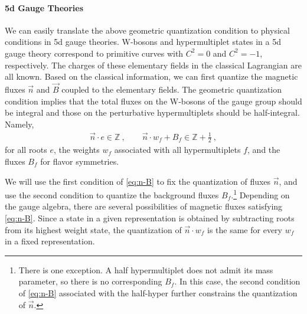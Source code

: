 \paragraph{5d Gauge Theories}
We can easily translate the above geometric quantization condition to physical conditions in 5d gauge theories. W-bosons and hypermultiplet states in a 5d gauge theory correspond to primitive curves with $C^2=0$ and $C^2=-1$, respectively. The charges of these elementary fields in the classical Lagrangian are all known. Based on the classical information, we can first quantize the magnetic fluxes $\vec{n}$ and $\vec{B}$ coupled to the elementary fields. The geometric quantization condition implies that the total fluxes on the W-bosons of the gauge group should be integral and those on the perturbative hypermultiplets should be half-integral. Namely,
\begin{align}\label{eq:n-B}
	\vec{n}\cdot e \in \mathbb{Z} \ , \qquad \vec{n}\cdot w_f + B_f \in \mathbb{Z}+\frac{1}{2} \ ,
\end{align}
for all roots $e$, the weights $w_f$ associated with all hypermultiplets $f$, and the fluxes $B_f$ for flavor symmetries. 

We will use the first condition of \eqref{eq:n-B} to fix the quantization of fluxes $ \vec{n}$, and use the second condition to quantize the background fluxes $B_f$.\footnote{There is one exception. A half hypermultiplet does not admit its mass parameter, so there is no corresponding $ B_f$. In this case, the second condition of \eqref{eq:n-B} associated with the half-hyper further constrains the quantization of $ \vec{n}$.} Depending on the gauge algebra, there are several possibilities of magnetic fluxes satisfying \eqref{eq:n-B}. Since a state in a given representation is obtained by subtracting roots from its highest weight state, the quantization of $ \vec{n}\cdot w_f $ is the same for every $ w_f $ in a fixed representation.

